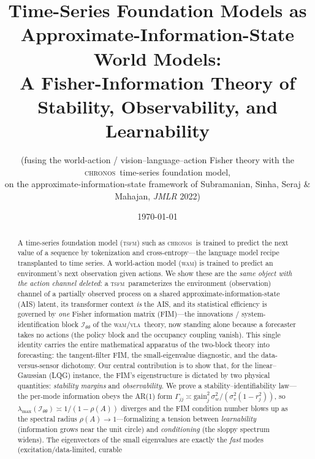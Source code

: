 \documentclass[10pt]{article}
\theoremstyle{plain}
\theoremstyle{definition}
\theoremstyle{remark}
\newcommand{\Fisher}{\mathcal{I}}
\newcommand{\Ith}{\Fisher_{\theta\theta}}
\newcommand{\TSFM}{\textsc{tsfm}}
\newcommand{\WAM}{\textsc{wam}}
\newcommand{\VLA}{\textsc{vla}}
\newcommand{\Chronos}{\textsc{chronos}}
\begin{document}
\title{\bfseries Time-Series Foundation Models as
Approximate-Information-State World Models:\\[3pt]
\large A Fisher-Information Theory of Stability, Observability, and Learnability}
\author{\normalsize (fusing the world-action / vision--language--action Fisher
theory with the \Chronos\ time-series foundation model,\\[-1pt]
\normalsize on the approximate-information-state framework of Subramanian,
Sinha, Seraj \& Mahajan, {\itshape JMLR} 2022)}
\date{\today}
\maketitle
\thispagestyle{plain}

\begin{abstract}\noindent
A time-series foundation model (\TSFM) such as \Chronos\ is trained to predict
the next value of a sequence by tokenization and cross-entropy---the language
model recipe transplanted to time series. A world-action model (\WAM) is trained
to predict an environment's next observation given actions. We show these are
the \emph{same object with the action channel deleted}: a \TSFM\ parameterizes
the environment (observation) channel of a partially observed process on a
shared approximate-information-state (AIS) latent, its transformer context
\emph{is} the AIS, and its statistical efficiency is governed by \emph{one}
Fisher information matrix (FIM)---the innovations / system-identification block
$\Ith$ of the \WAM/\VLA\ theory, now standing alone because a forecaster takes
no actions (the policy block and the occupancy coupling vanish). This single
identity carries the entire mathematical apparatus of the two-block theory into
forecasting: the tangent-filter FIM, the small-eigenvalue diagnostic, and the
data-versus-sensor dichotomy. Our central contribution is to show that, for the
linear--Gaussian (LQG) instance, the FIM's eigenstructure is dictated by two
physical quantities: \emph{stability margins} and \emph{observability}. We prove
a stability--identifiability law---the per-mode information obeys the AR(1) form
$\Gamma_{jj}\asymp \mathrm{gain}_j^2\,\sigma_w^2/(\sigma_v^2(1-r_j^2))$, so
$\lambda_{\max}(\Ith)\asymp 1/(1-\rho(A))$ diverges and the FIM condition number
blows up as the spectral radius $\rho(A)\to 1$---formalizing a tension between
\emph{learnability} (information grows near the unit circle) and
\emph{conditioning} (the sloppy spectrum widens). The eigenvectors of the small
eigenvalues are exactly the \emph{fast} modes (excitation/data-limited, curable

\end{abstract}
\end{document}
